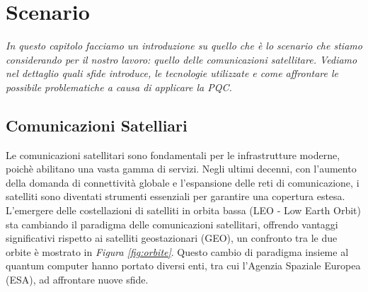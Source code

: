 
\chapter{Scenario} %

\label{Chapter3} %

\textit{In questo capitolo facciamo un introduzione su quello che è lo scenario che stiamo considerando per il nostro lavoro: 
quello delle comunicazioni satellitare. Vediamo nel dettaglio quali sfide introduce, le tecnologie utilizzate 
e come affrontare le possibile problematiche a causa di applicare la PQC.}


\section{Comunicazioni Satelliari}


Le comunicazioni satellitari sono fondamentali per le infrastrutture moderne, poichè abilitano una vasta gamma di servizi.
Negli ultimi decenni, con l'aumento della domanda di connettività globale e l'espansione delle reti di comunicazione, i satelliti sono diventati strumenti essenziali per garantire una copertura estesa.
L'emergere delle costellazioni di satelliti in orbita bassa (LEO - Low Earth Orbit) sta cambiando il paradigma delle comunicazioni satellitari, offrendo vantaggi significativi rispetto ai satelliti geostazionari (GEO), un confronto tra le due orbite è mostrato in \textit{Figura \ref{fig:orbite}}. 
Questo cambio di paradigma insieme al quantum computer hanno portato diversi enti, tra cui l'Agenzia Spaziale Europea (ESA), ad affrontare nuove sfide.

